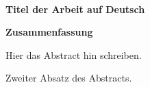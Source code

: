 




\begin{center}
  \HRule\\[0.4cm]
  \Large\bfseries
  Titel der Arbeit auf Deutsch
  \HRule\\[1.5cm]
\end{center}

\begin{center}
  \bfseries
  \large
  Zusammenfassung
\end{center}

\begin{otherlanguage}{ngerman}
\noindent
Hier das Abstract hin schreiben.
\blindtext

Zweiter Absatz des Abstracts.
\blindtext

\end{otherlanguage}

\cleardoublepage
